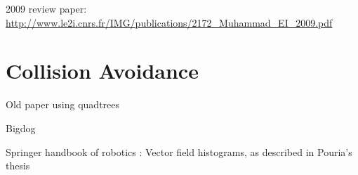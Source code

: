 2009 review paper: \url{http://www.le2i.cnrs.fr/IMG/publications/2172_Muhammad_EI_2009.pdf}

\section{Collision Avoidance}
Old paper using quadtrees\cite{ghoshray1996comprehensive}

Bigdog \cite{raibert2008bigdog}

Springer handbook of robotics \cite{siciliano2008springer}: Vector field histograms, as described in Pouria's thesis \cite{talebifard2014risk}


